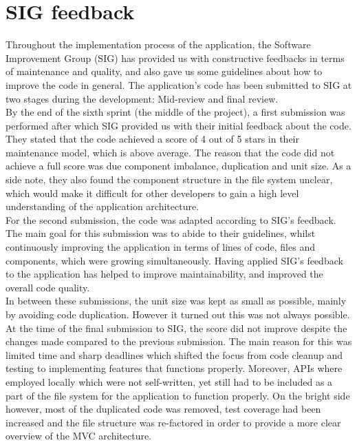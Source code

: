 \section{SIG feedback} %
Throughout the implementation process of the application, the Software Improvement Group (SIG) has provided us with constructive feedbacks in terms of maintenance and quality, and also gave us some guidelines about how to improve the code in general. The application's code has been submitted to SIG at two stages during the development: Mid-review and final review.\\

By the end of the sixth sprint (the middle of the project), a first submission was performed after which SIG provided us with their initial feedback about the code. They stated that the code achieved a score of 4 out of 5 stars in their maintenance model, which is above average. The reason that the code did not achieve a full score was due component imbalance, duplication and unit size. As a side note, they also found the component structure in the file system unclear, which would make it difficult for other developers to gain a high level understanding of the application architecture.\\

For the second submission, the code was adapted according to SIG's feedback. The main goal for this submission was to abide to their guidelines, whilst continuously improving the application in terms of lines of code, files and components, which were growing simultaneously. Having applied SIG's feedback to the application has helped to improve maintainability, and improved the overall code quality.\\
 
In between these submissions, the unit size was kept as small as possible, mainly by avoiding code duplication. However it turned out this was not always possible. At the time of the final submission to SIG, the score did not improve despite the changes made compared to the previous submission. The main reason for this was limited time and sharp deadlines which shifted the focus from code cleanup and testing to implementing features that functions properly. Moreover, APIs where employed locally which were not self-written, yet still had to be included as a part of the file system for the application to function properly. On the bright side however, most of the duplicated code was removed, test coverage had been increased and the file structure was re-factored in order to provide a more clear overview of the MVC architecture.\\ 